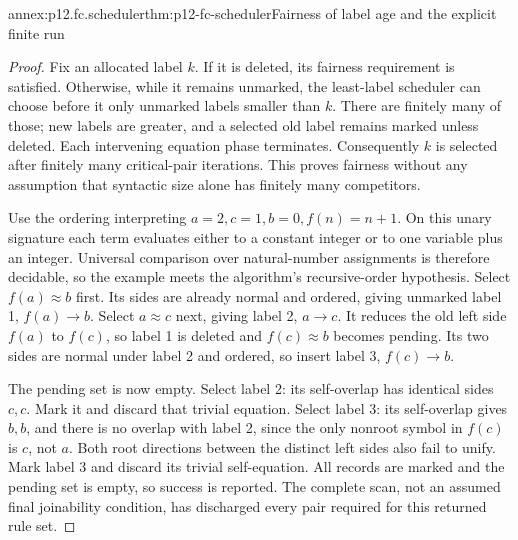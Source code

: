 \begin{annexitem}{annex:p12.fc.scheduler}{thm:p12-fc-scheduler}{Fairness of label age and the explicit finite run}
\begin{proof}
Fix an allocated label \(k\). If it is deleted, its fairness
requirement is satisfied. Otherwise, while it remains unmarked,
the least-label scheduler can choose before it only unmarked
labels smaller than \(k\). There are finitely many of those;
new labels are greater, and a selected old label remains marked
unless deleted. Each intervening equation phase terminates.
Consequently \(k\) is selected after finitely many critical-pair
iterations. This proves fairness without any assumption that
syntactic size alone has finitely many competitors.

Use the ordering interpreting \(a=2,c=1,b=0,f(n)=n+1\).
On this unary signature each term evaluates either to a constant
integer or to one variable plus an integer. Universal comparison
over natural-number assignments is therefore decidable, so the
example meets the algorithm's recursive-order hypothesis.
Select \(f(a)\approx b\) first. Its sides are already normal
and ordered, giving unmarked label 1, \(f(a)\to b\).
Select \(a\approx c\) next, giving label 2, \(a\to c\).
It reduces the old left side \(f(a)\) to \(f(c)\), so label 1
is deleted and \(f(c)\approx b\) becomes pending. Its two
sides are normal under label 2 and ordered, so insert label 3,
\(f(c)\to b\).

The pending set is now empty. Select label 2: its self-overlap
has identical sides \(c,c\). Mark it and discard that trivial
equation. Select label 3: its self-overlap gives \(b,b\), and
there is no overlap with label 2, since the only nonroot symbol
in \(f(c)\) is \(c\), not \(a\). Both root directions
between the distinct left sides also fail to unify. Mark label 3
and discard its trivial self-equation. All records are marked
and the pending set is empty, so success is reported.
The complete scan, not an assumed final joinability condition,
has discharged every pair required for this returned rule set.
\end{proof}
\end{annexitem}

